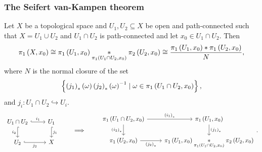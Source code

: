 \subsubsection{The Seifert van-Kampen theorem}

\begin{theorem}
Let $ X $ be a topological space and $ U_1, U_2 \subseteq X $ be open and path-connected such that $ X = U_1 \cup U_2 $ and $ U_1 \cap U_2 $ is path-connected and let $ x_0 \in U_1 \cap U_2 $. Then
$$ \pi_1\left( X, x_0 \right) \cong \pi_1\left( U_1, x_0 \right) \underset{\pi_1\left( U_1 \cap U_2, x_0 \right)}{*} \pi_2\left( U_2, x_0 \right) \cong \dfrac{\pi_1\left( U_1, x_0 \right) * \pi_1\left( U_2, x_0 \right)}{N}, $$
where $ N $ is the normal closure of the set
$$ \left\{ \left( j_1 \right)_*\left( \omega \right)\left( j_2 \right)_*\left( \omega \right)^{-1} \mid \omega \in \pi_1\left( U_1 \cap U_2, x_0 \right) \right\}, $$
and $ j_i : U_1 \cap U_2 \hookrightarrow U_i $.
$$
\begin{tikzcd}
U_1 \cap U_2 \arrow[hookrightarrow]{r}{i_1} \arrow[hookrightarrow, swap]{d}{i_2} & U_1 \arrow[hookrightarrow]{d}{j_1} \\
U_2 \arrow[hookrightarrow, swap]{r}{j_2} & X
\end{tikzcd}
\qquad \implies \qquad
\begin{tikzcd}
\pi_1\rb{U_1 \cap U_2, x_0} \arrow{r}{\rb{i_1}_*} \arrow[swap]{d}{\rb{i_2}_*} & \pi_1\rb{U_1, x_0} \arrow{d}{\rb{j_1}_*} \\
\pi_1\rb{U_2, x_0} \arrow[swap]{r}{\rb{j_2}_*} & \pi_1\rb{U_1, x_0} \underset{\pi_1\rb{U_1 \cap U_2, x_0}}{*} \pi_2\rb{U_2, x_0}
\end{tikzcd}.
$$
\end{theorem}

